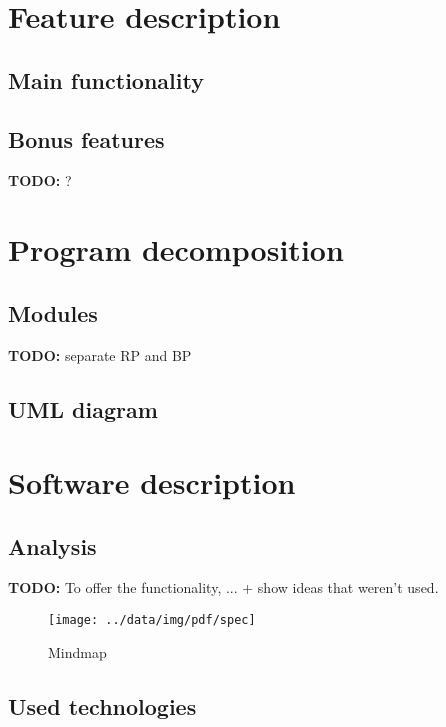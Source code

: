 \documentclass[10pt,a4paper,oneside]{article}
\newcommand{\TODO}[1]{{\textbf{TODO:} #1}} %
\begin{document}
\section{Feature description}



\subsection{Main functionality}
\subsection{Bonus features} \TODO ?










\section{Program decomposition}

\subsection{Modules}
\TODO separate RP and BP
\subsection{UML diagram}








\section{Software description}


\subsection{Analysis}
\TODO To offer the functionality, ... + show ideas that weren't used.

\FloatBarrier
\begin{figure}
        \centering
        \texttt{[image: ../data/img/pdf/spec]}
        \caption{Mindmap}
        \label{fig:mindmap}
\end{figure}
\FloatBarrier

\subsection{Used technologies}
\end{document}
